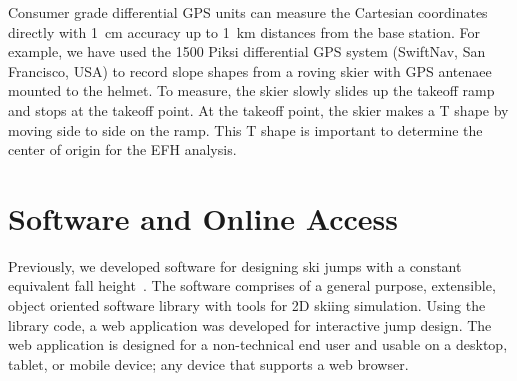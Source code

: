 \documentclass{article}
\begin{document}
Consumer grade differential GPS units can measure the Cartesian coordinates
directly with 1~\si{\centi\meter} accuracy up to 1~\si{\kilo\meter}
distances from the base station. For example, we have used the 1500 Piksi
differential GPS system (SwiftNav, San Francisco, USA) to record slope shapes
from a roving skier with GPS antenaee mounted to the helmet. To measure, the
skier slowly slides up the takeoff ramp and stops at the takeoff point. At
the takeoff point, the skier makes a T shape by moving side to side on the
ramp. This T shape is important to determine the center of origin for the EFH
analysis. 



\section{Software and Online Access}
%
Previously, we developed software for designing ski jumps with a constant
equivalent fall height~\cite{Moore2018}. The software comprises of a general
purpose, extensible, object oriented software library with tools for 2D skiing
simulation. Using the library code, a web application was developed for
interactive jump design. The web application is designed for a non-technical
end user and usable on a desktop, tablet, or mobile device; any device that
supports a web browser.
\end{document}
